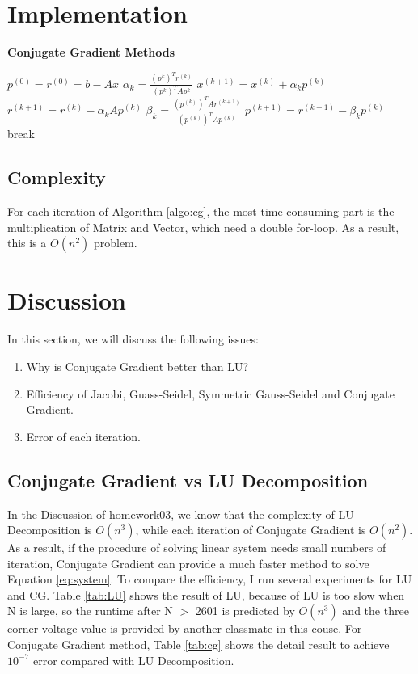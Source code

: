 \documentclass{article}
\begin{document}
\section{Implementation}
\begin{algorithm}[H]
    \caption{\textbf{Conjugate Gradient Methods}}
    \label{algo:cg}
    \begin{algorithmic}
        \State $p^{(0)} = r^{(0)} = b - Ax$
            \State $\alpha_k = \frac{(p^{k})^Tr^{(k)}}{(p^{k})^TAp^{k}}$
            \State $x^{(k+1)} = x^{(k)} + \alpha_kp^{(k)}$
            \State $r^{(k+1)} = r^{(k)} - \alpha_kAp^{(k)}$
            \State $\beta_k = \frac{(p^{(k)})^TAr^{(k+1)}}{(p^{(k)})^TAp^{(k)}}$
            \State $p^{(k+1)} = r^{(k+1)} - \beta_kp^{(k)}$
                \State break
            \EndIf
        \EndFor
    \end{algorithmic}
\end{algorithm}
\subsection{Complexity}
\label{sec:complexity}
For each iteration of Algorithm \ref{algo:cg}, the most time-consuming part is the multiplication of Matrix and Vector, which need a double for-loop.
As a result, this is a {\boldmath$O(n^2)$} problem.

\section{Discussion}
In this section, we will discuss the following issues:
\begin{enumerate}
    \item Why is Conjugate Gradient better than LU?
    \item Efficiency of Jacobi, Guass-Seidel, Symmetric Gauss-Seidel and Conjugate Gradient.
    \item Error of each iteration.
\end{enumerate}

\subsection{Conjugate Gradient vs LU Decomposition}
In the Discussion of homework03, we know that the complexity of LU Decomposition is $O(n^3)$, while each iteration of Conjugate Gradient is $O(n^2)$.
As a result, if the procedure of solving linear system needs small numbers of iteration, Conjugate Gradient can provide a much faster method to
solve Equation \ref{eq:system}. \newline
To compare the efficiency, I run several experiments for LU and CG. Table \ref{tab:LU} shows the result of LU, because of LU is too slow when N is
large, so the runtime after N $>$ 2601 is predicted by $O(n^3)$ and the three corner voltage value is provided by another classmate in this couse.
For Conjugate Gradient method, Table \ref{tab:cg} shows the detail result to achieve $10^{-7}$ error compared with LU Decomposition.
\end{document}
